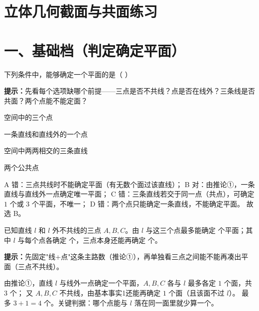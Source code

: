 \documentclass{exam-zh}
\begin{document}
\section*{立体几何截面与共面练习}

\section*{一、基础档（判定确定平面）}


\begin{question}[points=6]
  下列条件中，能够确定一个平面的是（    ）
  \begin{hintbox}
\textbf{提示：}先看每个选项缺哪个前提——三点是否不共线？点是否在线外？三条线是否共面？两个点能不能定面？\end{hintbox}

  \begin{choices}
    \item 空间中的三个点
    \item 一条直线和直线外的一个点
    \item 空间中两两相交的三条直线
    \item 两个公共点
  \end{choices}
  \paren[B]
  \begin{solutionblock}
    A 错：三点共线时不能确定平面（有无数个面过该直线）；
B 对：由推论①，一条直线与直线外一点确定唯一平面；
C 错：三条直线若交于同一点（共点），可确定 $1$ 个或 $3$ 个平面，不唯一；
D 错：两个点只能确定一条直线，不能确定平面。
故选 B。
  \end{solutionblock}
\end{question}



\begin{question}[points=6]
  已知直线 $l$ 和 $l$ 外不共线的三点 $A,B,C$。由 $l$ 与这三个点最多能确定 \underline{\quad\quad} 个平面；其中 $l$ 与每个点各确定 \underline{\quad} 个，三点本身还能再确定 \underline{\quad} 个。
  \begin{hintbox}
\textbf{提示：}先固定"线+点"这条主路数（推论①），再单独看三点之间能不能再凑出平面（三点不共线）。\end{hintbox}

  \paren[4；1；1]
  \begin{solutionblock}
    由推论①，直线 $l$ 与线外一点确定一个平面，$A,B,C$ 各与 $l$ 最多各定 $1$ 个面，共 $3$ 个；
又 $A,B,C$ 不共线，由基本事实1还能再确定 $1$ 个面（且该面不过 $l$）。
最多 $3+1=4$ 个。关键判据：哪个点能与 $l$ 落在同一面里就少算一个。
  \end{solutionblock}
\end{question}
\end{document}
